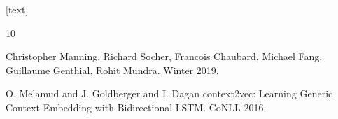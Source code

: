 \begin{frame}
[text]
\begin{thebibliography}{10}

\alert{Christopher Manning, Richard Socher, Francois Chaubard, Michael Fang, Guillaume Genthial, Rohit Mundra.}
\newblock Winter 2019.


\alert{O. Melamud and J. Goldberger and I. Dagan}
\newblock context2vec: Learning Generic Context Embedding with Bidirectional LSTM.
\newblock CoNLL 2016.
\end{thebibliography}
\end{frame}





